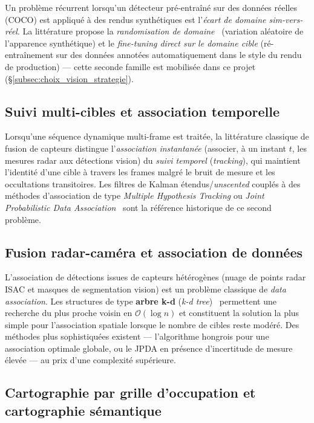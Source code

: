 \documentclass[12pt,a4paper,titlepage]{article}
\begin{document}
Un problème récurrent lorsqu'un détecteur pré-entraîné sur des données réelles (COCO) est appliqué à des rendus synthétiques est l'\textit{écart de domaine sim-vers-réel}. La littérature propose la \textit{randomisation de domaine}~\cite{domain_randomization} (variation aléatoire de l'apparence synthétique) et le \textit{fine-tuning direct sur le domaine cible} (ré-entraînement sur des données annotées automatiquement dans le style du rendu de production) --- cette seconde famille est mobilisée dans ce projet (\S\ref{subsec:choix_vision_strategie}).

\subsection{Suivi multi-cibles et association temporelle}
\label{subsec:art_tracking}

Lorsqu'une séquence dynamique multi-frame est traitée, la littérature classique de fusion de capteurs distingue l'\textit{association instantanée} (associer, à un instant $t$, les mesures radar aux détections vision) du \textit{suivi temporel} (\textit{tracking}), qui maintient l'identité d'une cible à travers les frames malgré le bruit de mesure et les occultations transitoires. Les filtres de Kalman étendus/\textit{unscented} couplés à des méthodes d'association de type \textit{Multiple Hypothesis Tracking} ou \textit{Joint Probabilistic Data Association}~\cite{bar_shalom_tracking} sont la référence historique de ce second problème.

\subsection{Fusion radar-caméra et association de données}
\label{subsec:art_fusion}

L'association de détections issues de capteurs hétérogènes (nuage de points radar ISAC et masques de segmentation vision) est un problème classique de \textit{data association}. Les structures de type \textbf{arbre k-d} (\textit{k-d tree})~\cite{bentley_kdtree} permettent une recherche du plus proche voisin en $\mathcal{O}(\log n)$ et constituent la solution la plus simple pour l'association spatiale lorsque le nombre de cibles reste modéré. Des méthodes plus sophistiquées existent --- l'algorithme hongrois pour une association optimale globale, ou le JPDA en présence d'incertitude de mesure élevée --- au prix d'une complexité supérieure.

\subsection{Cartographie par grille d'occupation et cartographie sémantique}
\label{subsec:art_occupancy}
\end{document}
